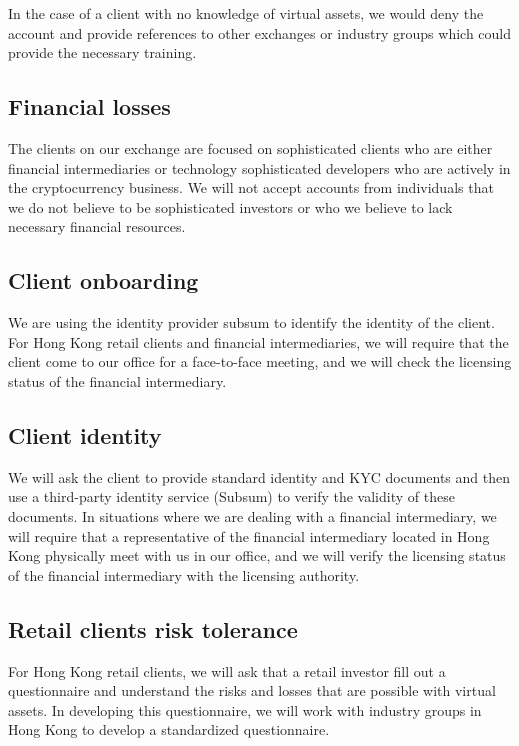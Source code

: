 In the case of a client with no knowledge of virtual assets, we would deny
the account and provide references to other exchanges or industry
groups which could provide the necessary training.

\subsection{Financial losses}

The clients on our exchange are focused on sophisticated clients who
are either financial intermediaries or technology sophisticated
developers who are actively in the cryptocurrency business.  We will
not accept accounts from individuals that we do not believe to be
sophisticated investors or who we believe to lack necessary financial
resources.

\subsection{Client onboarding}

We are using the identity provider subsum to identify the identity of
the client.  For Hong Kong retail clients and financial
intermediaries, we will require that the client come to our office for
a face-to-face meeting, and we will check the licensing status of the
financial intermediary.

\subsection{Client identity}
We will ask the client to provide standard identity and KYC documents
and then use a third-party identity service (Subsum) to verify the
validity of these documents.  In situations where we are dealing with
a financial intermediary, we will require that a representative of the
financial intermediary located in Hong Kong physically meet with us in
our office, and we will verify the licensing status of the financial
intermediary with the licensing authority.

\subsection{Retail clients risk tolerance}

For Hong Kong retail clients, we will ask that a retail investor fill
out a questionnaire and understand the risks and losses that are
possible with virtual assets.  In developing this questionnaire, we will
work with industry groups in Hong Kong to develop a standardized
questionnaire.


